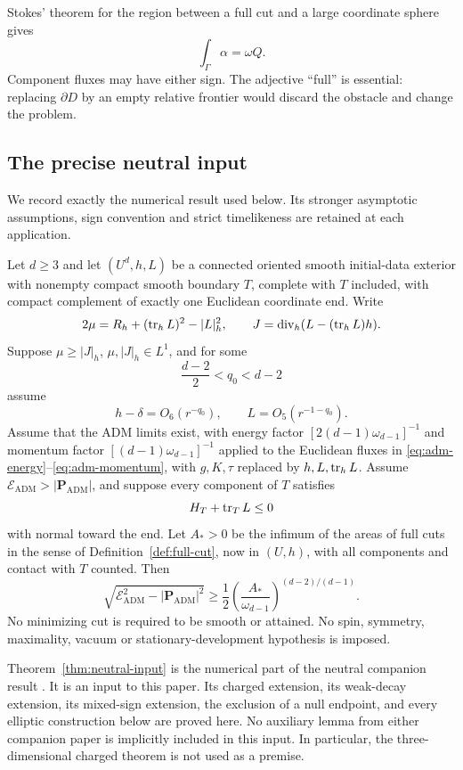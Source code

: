 Stokes' theorem for the region between a full cut and a large coordinate sphere gives
\begin{equation}\label{eq:full-cut-flux}
 \int_\Gamma\alpha=\omega Q.
\end{equation}
Component fluxes may have either sign. The adjective ``full'' is essential: replacing $\partial D$ by an empty relative frontier would discard the obstacle and change the problem.

\subsection{The precise neutral input}

We record exactly the numerical result used below. Its stronger asymptotic assumptions, sign convention and strict timelikeness are retained at each application.

\begin{theorem}\label{thm:neutral-input}
Let $d\ge3$ and let $(U^d,h,L)$ be a connected oriented smooth initial-data exterior with nonempty compact smooth boundary $T$, complete with $T$ included, with compact complement of exactly one Euclidean coordinate end. Write
\[
 2\mu=R_h+(\operatorname{tr}_hL)^2-|L|_h^2,
 \qquad J=\operatorname{div}_h(L-(\operatorname{tr}_hL)h).
\]
Suppose $\mu\ge|J|_h$, $\mu,|J|_h\in L^1$, and for some
\[
 \frac{d-2}{2}<q_0<d-2
\]
assume
\[
 h-\delta=O_6(r^{-q_0}),\qquad L=O_5(r^{-1-q_0}).
\]
Assume that the ADM limits exist, with energy factor
$[2(d-1)\omega_{d-1}]^{-1}$ and momentum factor
$[(d-1)\omega_{d-1}]^{-1}$ applied to the Euclidean fluxes in
\eqref{eq:adm-energy}--\eqref{eq:adm-momentum}, with $g,K,\tau$ replaced by $h,L,\operatorname{tr}_hL$.
Assume $\mathcal E_{\mathrm{ADM}}>|\mathbf P_{\mathrm{ADM}}|$, and suppose every component of $T$ satisfies
\[
 H_T+\operatorname{tr}_TL\le0
\]
with normal toward the end. Let $A_*>0$ be the infimum of the areas of full cuts in the sense of Definition~\ref{def:full-cut}, now in $(U,h)$, with all components and contact with $T$ counted. Then
\begin{equation}\label{eq:neutral-input}
 \sqrt{\mathcal E_{\mathrm{ADM}}^2-|\mathbf P_{\mathrm{ADM}}|^2}
 \ge\frac12\left(\frac{A_*}{\omega_{d-1}}\right)^{(d-2)/(d-1)}.
\end{equation}
No minimizing cut is required to be smooth or attained. No spin, symmetry, maximality, vacuum or stationary-development hypothesis is imposed.
\end{theorem}

Theorem~\ref{thm:neutral-input} is the numerical part of the neutral companion result \cite[Definitions 1.1--1.2 and Theorem 1.3]{NeutralV6S74}. It is an input to this paper. Its charged extension, its weak-decay extension, its mixed-sign extension, the exclusion of a null endpoint, and every elliptic construction below are proved here. No auxiliary lemma from either companion paper is implicitly included in this input. In particular, the three-dimensional charged theorem \cite{ChargedV6S818} is not used as a premise.

